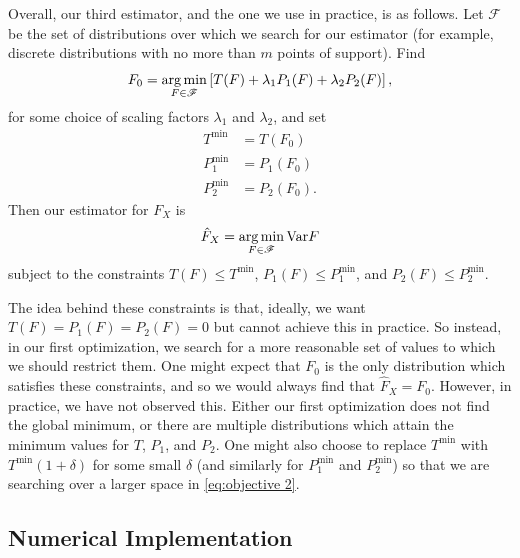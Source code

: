 	Overall, our third estimator, and the one we use in practice, is as follows. Let $\mathscr{F}$ be the set of distributions over which we search for our estimator (for example, discrete distributions with no more than $m$ points of support). Find
	\begin{equation}
		F_0 = \operatorname*{arg\,min}_{F \in \mathscr{F}} \left[T(F) + \lambda_1 P_1(F) + \lambda_2 P_2(F)\right],
		\label{eq:objective 1}
	\end{equation}
	for some choice of scaling factors $\lambda_1$ and $\lambda_2$, and set
	\begin{align}
		T^\mathrm{min} &= T(F_0)\\
		P_1^\mathrm{min} &= P_1(F_0)\\
		P_2^\mathrm{min} &= P_2(F_0).
	\end{align}
	Then our estimator for $F_X$ is
	\begin{equation}
		\hat{F}_X = \operatorname*{arg\,min}_{F \in \mathscr{F}} \mathrm{Var}{F}
		\label{eq:objective 2}
	\end{equation}
	subject to the constraints $T(F) \leq T^\mathrm{min}$, $P_1(F) \leq P_1^\mathrm{min}$, and $P_2(F) \leq P_2^\mathrm{min}$.

	The idea behind these constraints is that, ideally, we want $T(F) = P_1(F) = P_2(F) = 0$ but cannot achieve this in practice. So instead, in our first optimization, we search for a more reasonable set of values to which we should restrict them. One might expect that $F_0$ is the only distribution which satisfies these constraints, and so we would always find that $\hat{F}_X = F_0$. However, in practice, we have not observed this. Either our first optimization does not find the global minimum, or there are multiple distributions which attain the minimum values for $T$, $P_1$, and $P_2$. One might also choose to replace $T^\mathrm{min}$ with $T^\mathrm{min}(1 + \delta)$ for some small $\delta$ (and similarly for $P_1^\mathrm{min}$ and $P_2^\mathrm{min}$) so that we are searching over a larger space in \eqref{eq:objective 2}.
	
	

	

	\subsection{Numerical Implementation}

